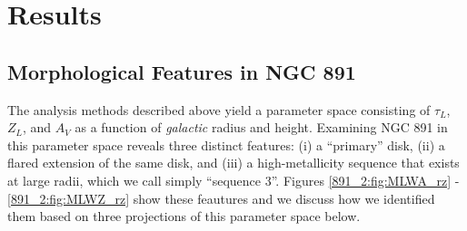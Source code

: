 \section{Results}
\label{891_2:sec:results}

\subsection{Morphological Features in NGC 891}
\label{891_2:sec:rz}

The analysis methods described above yield a parameter space
consisting of $\tau_L$, $Z_L$, and $A_V$ as a function of
\emph{galactic} radius and height. Examining NGC 891 in this parameter
space reveals three distinct features: (i) a ``primary'' disk, (ii) a
flared extension of the same disk, and (iii) a high-metallicity
sequence that exists at large radii, which we call simply ``sequence
3''. Figures \ref{891_2:fig:MLWA_rz} - \ref{891_2:fig:MLWZ_rz} show these
feautures and we discuss how we identified them based on three
projections of this parameter space below.







